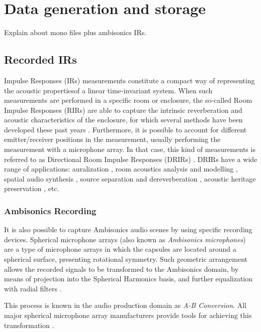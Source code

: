 \chapter{Data generation and storage}



Explain about mono files plus ambisonics IRs.


\section{Recorded IRs}


Impulse Responses (IRs) measurements constitute a compact way of representing the acoustic propertiesof a linear time-invariant system. When such measurements are performed in a specific room or enclosure, the so-called Room Impulse Responses (RIRs) are able to capture the intrinsic reverberation and acoustic characteristics of the enclosure, for which several methods have been developed these past years \cite{stan2002comparison}. Furthermore, it is possible to account for different emitter/receiver positions in the measurement, usually performing the measurement with a microphone array. In that case, this kind of measurements is referred to as Directional Room Impulse Responses (DRIRs) \cite{embrechts2005computation}. DRIRs have a wide range of applications: auralization \cite{embrechts2005computation}, room acoustics analysis \cite{embrechts2015measurement,clapp2011investigations} and modelling \cite{romblom2017diffuse}, spatial audio synthesis \cite{coleman2017object}, source separation and dereverberation \cite{baque2016separation}, acoustic heritage preservation \cite{gerzon1975recording,murphy2005multi}, etc. 


\subsection{Ambisonics Recording}

It is also possible to capture Ambisonics audio scenes by using specific recording devices. Spherical microphone arrays (also known as \textit{Ambisonics microphones}) are a type of microphone arrays in which the capsules are located around a spherical surface, presenting rotational symmetry. Such geometric arrangement allows the recorded signals to be transformed to the Ambisonics domain, by means of projection into the Spherical Harmonics basis, and further equalization with radial filters \cite{Bertet2006}.

This process is known in the audio production domain as \textit{A-B Conversion}. All major spherical microphone array manufacturers provide tools for achieving this transformation \cite{soundfield,ambeo,zylia,tetra,em32}.


